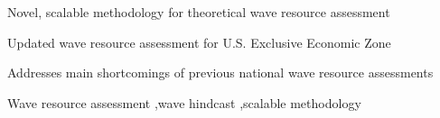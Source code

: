\documentclass[authoryear,preprint,review,12pt]{elsarticle}
\begin{document}
\begin{frontmatter}
\begin{highlights}
\item Novel, scalable methodology for theoretical wave resource assessment
\item Updated wave resource assessment for U.S. Exclusive Economic Zone
\item Addresses main shortcomings of previous national wave resource assessments
\end{highlights}

\begin{keyword}
    Wave resource assessment \sep wave hindcast \sep scalable methodology
\end{keyword}

\end{frontmatter}

\end{document}
